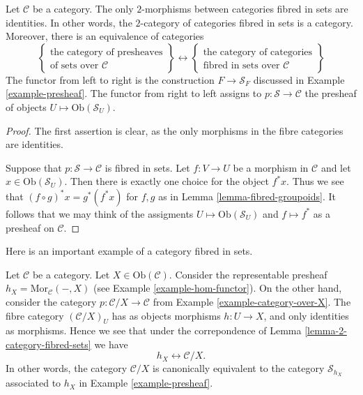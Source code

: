 \begin{lemma}
\label{lemma-2-category-fibred-sets}
Let $\mathcal{C}$ be a category.
The only $2$-morphisms between categories fibred in sets are identities.
In other words, the $2$-category of categories fibred in sets is a category.
Moreover, there is an equivalence of categories
$$
\left\{
\begin{matrix}
\text{the category of presheaves}\\
\text{of sets over }\mathcal{C}
\end{matrix}
\right\}
\leftrightarrow
\left\{
\begin{matrix}
\text{the category of categories}\\
\text{fibred in sets over }\mathcal{C}
\end{matrix}
\right\}
$$
The functor from left to right is the construction
$F \to \mathcal{S}_F$ discussed in
Example \ref{example-presheaf}.
The functor from right to left assigns to $p : \mathcal{S} \to \mathcal{C}$
the presheaf of objects $U \mapsto \text{Ob}(\mathcal{S}_U)$.
\end{lemma}

\begin{proof}
The first assertion is clear, as the only morphisms in the fibre
categories are identities.

\medskip\noindent
Suppose that $p :
\mathcal{S} \to \mathcal{C}$ is fibred in sets. Let $f : V \to U$
be a morphism in $\mathcal{C}$ and let $x \in \text{Ob}(\mathcal{S}_U)$.
Then there is exactly one choice for the object $f^\ast x$. Thus we see that
$(f \circ g)^\ast x = g^\ast(f^\ast x)$ for $f, g$ as in Lemma
\ref{lemma-fibred-groupoids}. It follows that we may think of the
assigments $U \mapsto \text{Ob}(\mathcal{S}_U)$ and $f \mapsto f^\ast$
as a presheaf on $\mathcal{C}$.
\end{proof}

\noindent
Here is an important example of a category fibred in sets.

\begin{example}
\label{example-fibred-category-from-functor-of-points}
Let $\mathcal{C}$ be a category. Let $X \in \text{Ob}(\mathcal{C})$.
Consider the representable presheaf $h_X = \text{Mor}_{\mathcal{C}}(-, X)$
(see Example \ref{example-hom-functor}).
On the other hand, consider the category $p : \mathcal{C}/X \to \mathcal{C}$
from Example \ref{example-category-over-X}.
The fibre category $(\mathcal{C}/X)_U$ has as objects morphisms
$h : U \to X$, and only identities as morphisms. Hence we see that
under the correpondence of
Lemma \ref{lemma-2-category-fibred-sets}
we have
$$
h_X \longleftrightarrow \mathcal{C}/X.
$$
In other words, the category $\mathcal{C}/X$ is canonically equivalent
to the category $\mathcal{S}_{h_X}$ associated
to $h_X$ in
Example \ref{example-presheaf}.
\end{example}

